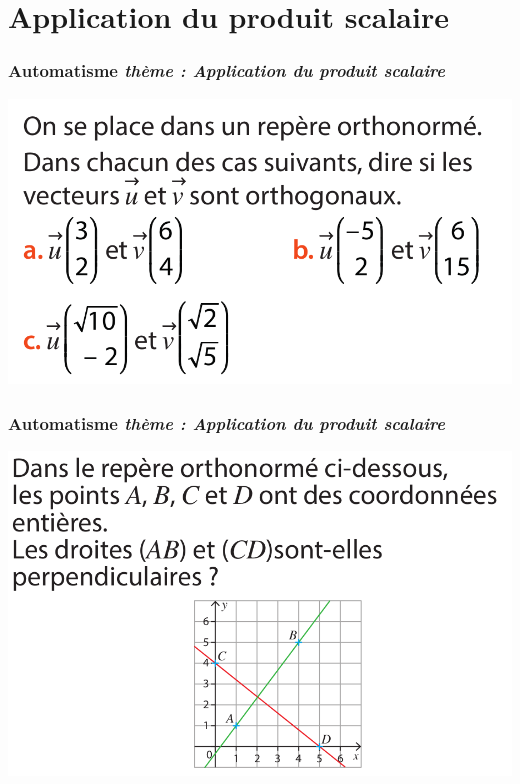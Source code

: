 \documentclass[11pt]{beamer}
\newcounter{autocompteur}
\newcommand{\automatisme}[1]{\addtocounter{autocompteur}{1}\frametitle{Automatisme  \theautocompteur  \textit{ thème : #1}}}
\begin{document}
\section{Application du produit scalaire}

\label{prodscalaire}

\begin{frame}
\automatisme{Application du produit scalaire}

\begin{center}
\includegraphics[scale=0.3]{ressources/prodscal-1.png}
\end{center}


\end{frame}


\begin{frame}
\automatisme{Application du produit scalaire}

\begin{center}
\includegraphics[scale=0.3]{ressources/prodscal-2.png}
\end{center}


\end{frame}
\end{document}
